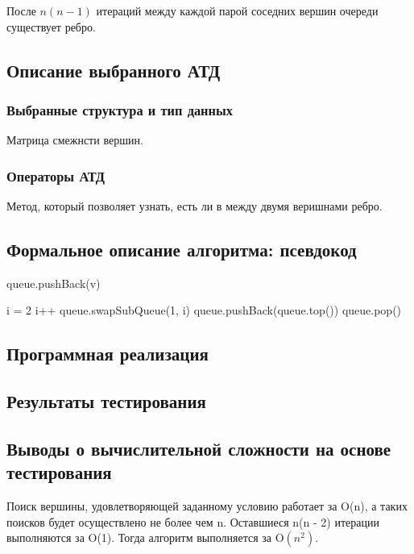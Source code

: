После $n(n - 1)$ итераций между каждой парой соседних вершин очереди существует ребро.

\subsection{Описание выбранного АТД}
\subsubsection{Выбранные структура и тип данных}
Матрица смежнсти вершин.
\subsubsection{Операторы АТД}
Метод, который позволяет узнать, есть ли в между двумя веришнами ребро.

\subsection{Формальное описание алгоритма: псевдокод}
\begin{algorithmic}[1]

\State queue.pushBack(v)
\EndFor


    \State i = 2
    \State  {}
            \State i++
            \EndWhile
    \State queue.swapSubQueue(1, i)
\EndIf
queue.pushBack(queue.top())
queue.pop()
\EndFor
\EndProcedure
\end{algorithmic}

\subsection{Программная реализация}


\subsection{Результаты тестирования}

\subsection{Выводы о вычислительной сложности на основе тестирования}
Поиск вершины, удовлетворяющей заданному условию работает за O(n), а таких поисков будет осуществлено не более чем n. Оставшиеся n(n - 2) итерации выполняются за O(1). Тогда алгоритм выполняется за O$(n^2)$.

